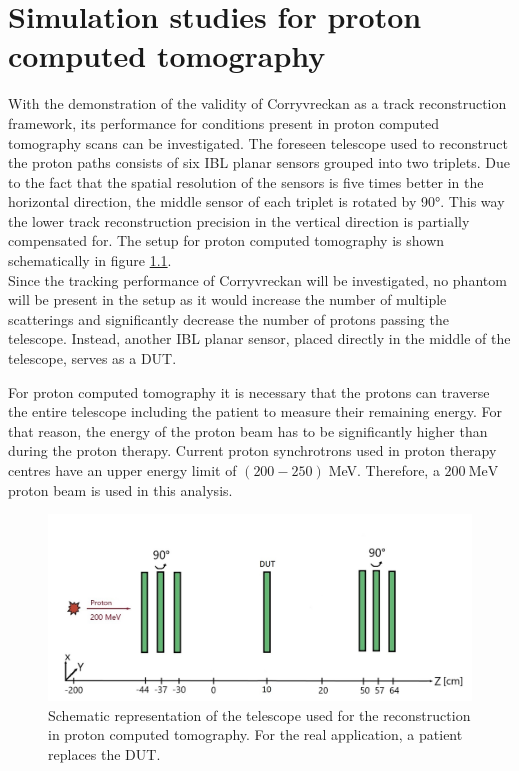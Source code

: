 \chapter{Simulation studies for proton computed tomography} \label{sec:setup}
With the demonstration of the validity of Corryvreckan as a track reconstruction framework, its performance for conditions present
in proton computed tomography scans can be investigated. The foreseen telescope used to reconstruct the proton paths consists of six IBL planar sensors
grouped into two triplets. Due to the fact that the spatial resolution of the sensors is five times better in the horizontal direction, the middle sensor
of each triplet is rotated by 90°. This way the lower track reconstruction precision in the vertical direction is partially compensated for.
The setup for proton computed tomography is shown schematically in figure \ref{fig:phantom}. \\
Since the tracking performance of Corryvreckan will be investigated, no
phantom will be present in the setup as it would
increase the number of multiple scatterings and significantly decrease the number of protons passing the telescope. Instead, another
IBL planar sensor, placed directly in the middle of the telescope, serves as a DUT.

For proton computed tomography it is necessary that the protons can traverse the entire telescope including the patient
to measure their remaining energy. For that reason, the energy of the proton beam has to be significantly higher than during
the proton therapy. Current proton synchrotrons used in proton therapy centres have an upper energy limit of $(200 - 250)\;$MeV.
Therefore, a $\SI{200}{\mega\eV}$ proton beam is used in this analysis.

\begin{figure}
  \centering
  \includegraphics[height=0.45\textwidth]{images/phantom_proton_4.jpg}
  \caption{Schematic representation of the telescope used for the reconstruction in proton computed tomography. For the real
  application, a patient replaces the DUT.}
  \label{fig:phantom}
\end{figure}



